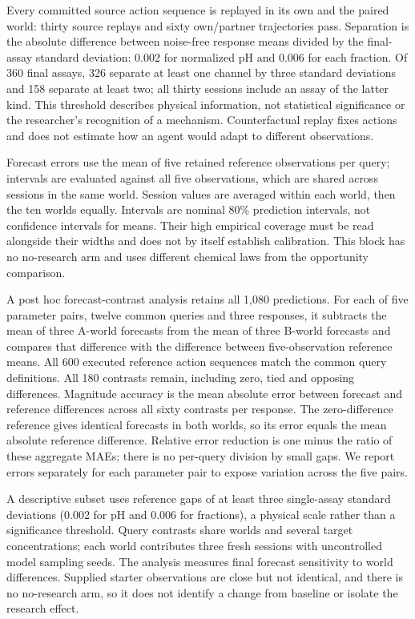 \documentclass[10pt,a4paper]{article}
\begin{document}
Every committed source action sequence is replayed in its own and the paired world: thirty source replays and sixty own/partner trajectories pass. Separation is the absolute difference between noise-free response means divided by the final-assay standard deviation: 0.002 for normalized pH and 0.006 for each fraction. Of 360 final assays, 326 separate at least one channel by three standard deviations and 158 separate at least two; all thirty sessions include an assay of the latter kind. This threshold describes physical information, not statistical significance or the researcher's recognition of a mechanism. Counterfactual replay fixes actions and does not estimate how an agent would adapt to different observations.

Forecast errors use the mean of five retained reference observations per query; intervals are evaluated against all five observations, which are shared across sessions in the same world. Session values are averaged within each world, then the ten worlds equally. Intervals are nominal 80\% prediction intervals, not confidence intervals for means. Their high empirical coverage must be read alongside their widths and does not by itself establish calibration. This block has no no-research arm and uses different chemical laws from the opportunity comparison.

A post hoc forecast-contrast analysis retains all 1,080 predictions. For each of five parameter pairs, twelve common queries and three responses, it subtracts the mean of three A-world forecasts from the mean of three B-world forecasts and compares that difference with the difference between five-observation reference means. All 600 executed reference action sequences match the common query definitions. All 180 contrasts remain, including zero, tied and opposing differences. Magnitude accuracy is the mean absolute error between forecast and reference differences across all sixty contrasts per response. The zero-difference reference gives identical forecasts in both worlds, so its error equals the mean absolute reference difference. Relative error reduction is one minus the ratio of these aggregate MAEs; there is no per-query division by small gaps. We report errors separately for each parameter pair to expose variation across the five pairs.

A descriptive subset uses reference gaps of at least three single-assay standard deviations (0.002 for pH and 0.006 for fractions), a physical scale rather than a significance threshold. Query contrasts share worlds and several target concentrations; each world contributes three fresh sessions with uncontrolled model sampling seeds. The analysis measures final forecast sensitivity to world differences. Supplied starter observations are close but not identical, and there is no no-research arm, so it does not identify a change from baseline or isolate the research effect.
\end{document}

